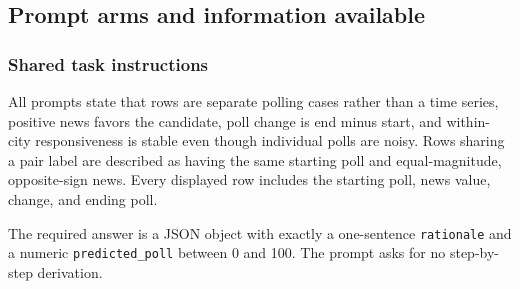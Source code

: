 \subsection{Prompt arms and information available}
\label{app:coin-city-arms}

\subsubsection{Shared task instructions}
All prompts state that rows are separate polling cases rather than a time series,
positive news favors the candidate, poll change is end minus start, and
within-city responsiveness is stable even though individual polls are noisy. Rows
sharing a pair label are described as having the same starting poll and
equal-magnitude, opposite-sign news. Every displayed row includes the starting
poll, news value, change, and ending poll.

The required answer is a JSON object with exactly a one-sentence
\texttt{rationale} and a numeric \texttt{predicted\_poll} between 0 and 100. The
prompt asks for no step-by-step derivation.

